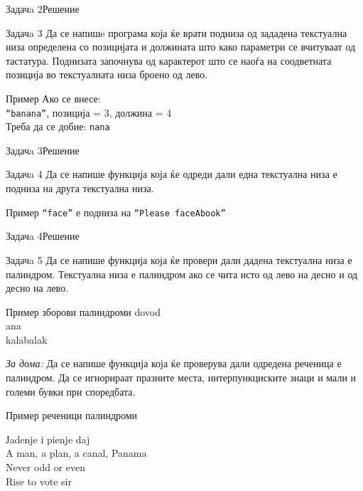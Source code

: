 \begin{frame}[fragile]{Задачa 2}{Решение} 

\end{frame}

\begin{frame}{Задачa 3}
    Да се напишe програма која ќе врати подниза од зададена текстуална низа
    определена со позицијата и должината што како параметри се вчитуваат од
    тастатура. Поднизата започнува од карактерот што се наоѓа на соодветната
    позиција во текстуалната низа броено од лево. 
\begin{exampleblock}{Пример}
Ако се внесе:\\
\texttt{``banana''}, позиција = 3, должина = 4\\
Треба да се добие: \texttt{nana}
\end{exampleblock}    
\end{frame}


\begin{frame}[fragile]{Задачa 3}{Решение}

\end{frame}

\begin{frame}{Задачa 4}
Да се напише функција која ќе одреди дали една текстуална низа е подниза на
друга текстуална низа.
\begin{exampleblock}{Пример}
\texttt{``face''} е подниза на \texttt{``Please faceAbook''}
\end{exampleblock}  
\end{frame}

\begin{frame}[fragile]{Задачa 4}{Решение}

\end{frame}

\begin{frame}{Задачa 5}
Да се напише функција која ќе провери дали дадена текстуална низа е палиндром.
Текстуална низа е палиндром ако се чита исто од лево на десно и од десно на
лево.
\begin{exampleblock}{Пример зборови палиндроми}
dovod\\
ana\\
kalabalak
\end{exampleblock}
\begin{scriptsize}
\emph{За дома:} Да се напише функција која ќе проверува дали одредена реченица е
палиндром. Да се игнорираат празните места, интерпункциските знаци и мали и
големи бувки при споредбата.
\end{scriptsize}
\begin{exampleblock}{Пример реченици палиндроми}
\begin{scriptsize}
Јadenje i pienje daj\\
A man, a plan, a canal, Panama\\
Never odd or even\\
Rise to vote sir
\end{scriptsize}
\end{exampleblock}

\end{frame}

